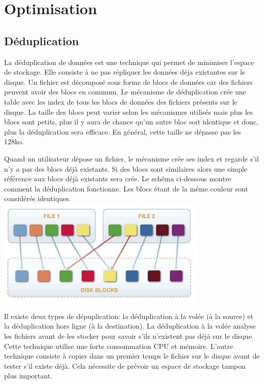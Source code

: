 \documentclass[a4paper,11pt]{report}
\begin{document}
\section{Optimisation}

\subsection{Déduplication}
La déduplication de données est une technique qui permet de minimiser l'espace de stockage. Elle consiste à ne pas répliquer les données déja existantes sur le disque. Un fichier est décomposé sous forme de blocs de données car des fichiers peuvent avoir des blocs en commum. Le mécanisme de déduplication crée une table avec les index de tous les blocs de données des fichiers présents sur le disque. La taille des blocs peut varier selon les mécanismes utilisés mais plus les blocs sont petits, plus il y aura de chance qu'un autre bloc soit identique et donc, plus la déduplication sera efficace. En général, cette taille ne dépasse pas les 128ko.
 
 Quand un utilisateur dépose un fichier, le mécanisme crée ses index et regarde s'il n'y a pas des blocs déjà existants. Si des blocs sont similaires alors une simple référence aux blocs déjà existants sera crée. Le schéma ci-dessous montre comment la déduplication fonctionne. Les blocs étant de la même couleur sont considérés identiques.\\
\includegraphics[width=10cm]{img/deduplication.jpg}

Il existe deux types de dépuplication: la déduplication à la volée (à la source) et la déduplication hors ligne (à la destination). La déduplication à la volée analyse les fichiers avant de les stocker pour savoir s'ils n'existent pas déjà sur le disque. Cette technique utilise une forte consommation CPU et mémoire. L'autre technique consiste à copier dans un premier temps le fichier sur le disque avant de tester s'il existe déjà. Cela nécessite de prévoir un espace de stockage tampon plus important. \\
\end{document}
